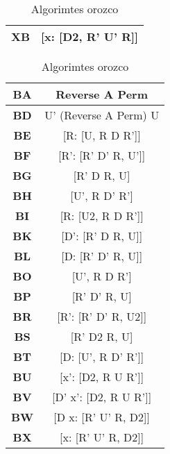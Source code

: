 \begin{table}[!h]
\begin{minipage}{.5\linewidth}
\begin{tabular}{|c|c|}
            \hline
            \textbf{XB} & [x: [D2, R' U' R]] \\
            \hline 
        \end{tabular}
    \end{minipage}
    \begin{minipage}{.5\linewidth}
        \centering
        \begin{tabular}{|c|c|}
            \hline
            \textbf{BA} & Reverse A Perm \\
            \hline
            \textbf{BD} & U' (Reverse A Perm) U \\
            \hline
            \textbf{BE} & [R: [U, R D R']] \\
            \hline
            \textbf{BF} & [R': [R' D' R, U']] \\
            \hline
            \textbf{BG} & [R' D R, U] \\
            \hline
            \textbf{BH} & [U', R D' R'] \\
            \hline
            \textbf{BI} & [R: [U2, R D R']] \\
            \hline
            \textbf{BK} & [D': [R' D R, U]] \\
            \hline
            \textbf{BL} & [D: [R' D' R, U]] \\
            \hline
            \textbf{BO} & [U', R D R'] \\
            \hline
            \textbf{BP} & [R' D' R, U] \\
            \hline
            \textbf{BR} & [R': [R' D' R, U2]] \\
            \hline
            \textbf{BS} & [R' D2 R, U] \\
            \hline
            \textbf{BT} & [D: [U', R D' R']] \\
            \hline
            \textbf{BU} & [x': [D2, R U R']] \\
            \hline
            \textbf{BV} & [D' x': [D2, R U R']] \\
            \hline
            \textbf{BW} & [D x: [R' U' R, D2]] \\
            \hline
            \textbf{BX} & [x: [R' U' R, D2]] \\
            \hline 
        \end{tabular}
    \end{minipage} 
    \caption{Algorimtes orozco}
    \label{fig:taula-orozco2}
\end{table}

